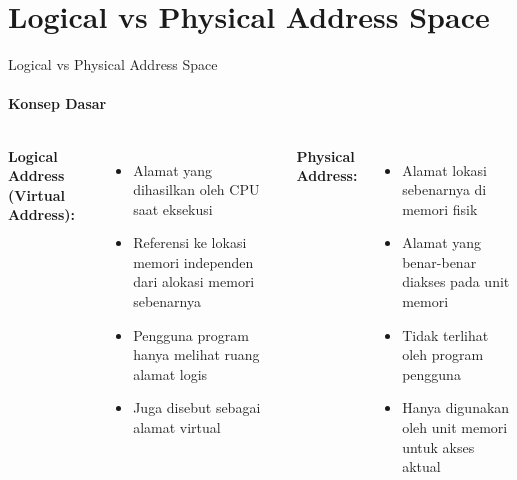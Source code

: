 \documentclass[10pt,aspectratio=169]{beamer}
\begin{document}
\section{Logical vs Physical Address Space}
\begin{frame}{Logical vs Physical Address Space}
    \framesubtitle{Konsep Dasar}
    
    \begin{columns}[T]
            \textbf{Logical Address (Virtual Address):}
            \begin{itemize}
                \item Alamat yang dihasilkan oleh CPU saat eksekusi
                \item Referensi ke lokasi memori independen dari alokasi memori sebenarnya
                \item Pengguna program hanya melihat ruang alamat logis
                \item Juga disebut sebagai alamat virtual
            \end{itemize}
            
            \textbf{Physical Address:}
            \begin{itemize}
                \item Alamat lokasi sebenarnya di memori fisik
                \item Alamat yang benar-benar diakses pada unit memori
                \item Tidak terlihat oleh program pengguna
                \item Hanya digunakan oleh unit memori untuk akses aktual
            \end{itemize}
    \end{columns}
\end{frame}
\end{document}
